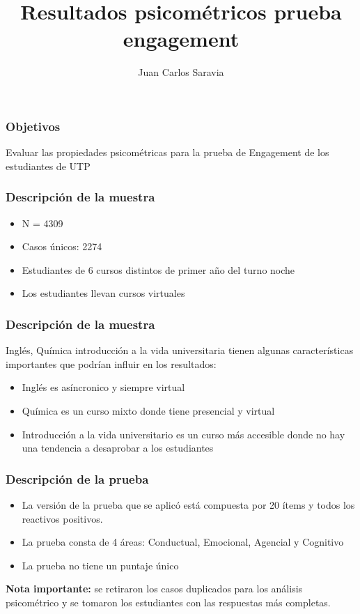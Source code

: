 \documentclass{beamer}
\title{Resultados psicométricos prueba engagement}
\author{Juan Carlos Saravia}
\date{}
\begin{document}
\begin{frame}
\titlepage
\end{frame}



\begin{frame}
\frametitle{Objetivos}
Evaluar las propiedades psicométricas para la prueba de Engagement de los estudiantes de UTP
\end{frame}



\begin{frame}
\frametitle{Descripción de la muestra}
\begin{itemize}
	\item N = 4309 
	\item Casos únicos: 2274 
	\item Estudiantes de 6 cursos distintos de primer año del turno noche
	\item Los estudiantes llevan cursos virtuales 
\end{itemize}
\end{frame}	

\begin{frame}
\frametitle{Descripción de la muestra}
Inglés, Química introducción a la vida universitaria tienen algunas características importantes que podrían influir en los resultados: \\

\begin{itemize}
	\item Inglés es asíncronico y siempre virtual
	\item Química es un curso mixto donde tiene presencial y virtual
	\item Introducción a la vida universitario es un curso más accesible donde no hay una tendencia a desaprobar a los estudiantes
\end{itemize}	
\end{frame}

\begin{frame}
\frametitle{Descripción de la prueba}
\begin{itemize}
	\item La versión de la prueba que se aplicó está compuesta por 20 ítems y todos los reactivos positivos. 
	\item La prueba consta de 4 áreas: Conductual, Emocional, Agencial y Cognitivo
	\item La prueba no tiene un puntaje único
\end{itemize}	


\alert{\textbf{Nota importante:}} se retiraron los casos duplicados para los análisis psicométrico y se tomaron los estudiantes con las respuestas más completas. 

\end{frame}
\end{document}
